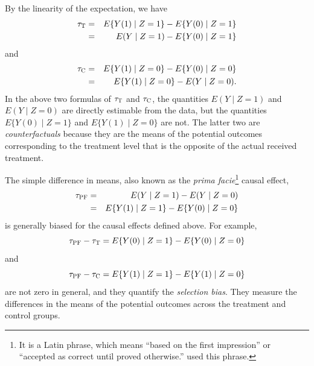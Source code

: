By the linearity of the expectation, we have
\begin{eqnarray*}
\tau_\textsc{T} &=&  E\{  Y(1)    \mid Z = 1 \} - E\{   Y(0)  \mid Z = 1 \}  \\
&=&  E(  Y    \mid Z = 1 ) - E\{   Y(0)  \mid Z = 1 \}
\end{eqnarray*}
 and
\begin{eqnarray*}
 \tau_\textsc{C} &=&  E\{  Y(1)    \mid Z = 0 \} - E\{   Y(0)  \mid Z = 0 \} \\
 &=&  E\{  Y(1)    \mid Z = 0 \} - E(  Y   \mid Z = 0 ).
\end{eqnarray*}
 In the above two formulas of $\tau_\textsc{T} $ and $\tau_\textsc{C} $, the quantities $E(Y    \mid Z = 1 ) $ and $E(   Y   \mid Z = 0 ) $ are directly estimable from the data, but the quantities $E\{   Y(0)  \mid Z = 1 \}$ and $E\{  Y(1)    \mid Z = 0 \}$ are not. The latter two are {\it counterfactuals} because they are the means of the potential outcomes corresponding to the treatment level that is the opposite of the actual received treatment. 
 

The simple difference in means, also known as the {\it prima facie}\footnote{It is a Latin phrase, which means ``based on the first impression'' or ``accepted as correct until proved otherwise.'' 
\citet{holland1986statistics} used this phrase. 
} causal effect,
\begin{eqnarray*}
\tau_\textsc{PF} &=& E(  Y    \mid Z = 1 )  - E(   Y   \mid Z = 0 )   \\
&=& E\{  Y(1)    \mid Z = 1 \}  - E\{   Y(0)  \mid Z = 0 \} 
\end{eqnarray*}
 is generally biased for the causal effects defined above. For example,
 $$
 \tau_\textsc{PF} - \tau_\textsc{T} = E\{   Y(0)  \mid Z = 1 \} - E\{   Y(0)  \mid Z = 0 \} 
 $$
 and
 $$
  \tau_\textsc{PF} - \tau_\textsc{C} =  E\{   Y(1)  \mid Z = 1 \} - E\{   Y(1)  \mid Z = 0 \} 
 $$
 are not zero in general, and they quantify the {\it selection bias}. They measure the differences in the means of the potential outcomes across the treatment and control groups. 
 
 
 
